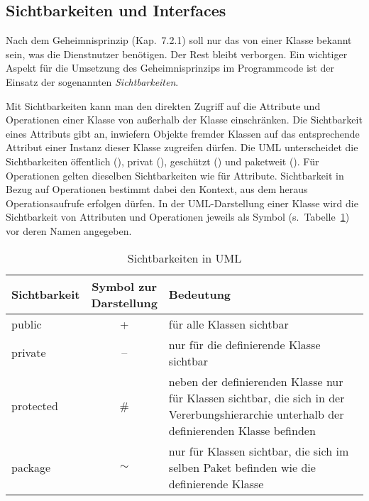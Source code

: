 \subsection{Sichtbarkeiten und Interfaces}
\label{sec:Kap-9.1.1}

Nach dem Geheimnisprinzip (Kap.~7.2.1) %
soll nur das von einer Klasse bekannt sein, was die Dienstnutzer benötigen. Der Rest bleibt verborgen. Ein wichtiger Aspekt für die Umsetzung des Geheimnisprinzips im Programmcode ist der Einsatz der sogenannten \textit{Sichtbarkeiten}.

Mit Sichtbarkeiten  kann man den direkten Zugriff auf die Attribute und Operationen einer Klasse von außerhalb der Klasse einschränken. Die Sichtbarkeit eines Attributs gibt an, inwiefern Objekte fremder Klassen auf das entsprechende Attribut einer Instanz dieser Klasse zugreifen dürfen. Die UML unterscheidet die Sichtbarkeiten öffentlich (), privat (), geschützt () und paketweit (). Für Operationen gelten dieselben Sichtbarkeiten wie für Attribute. Sichtbarkeit in Bezug auf Operationen bestimmt dabei den Kontext, aus dem heraus Operationsaufrufe erfolgen dürfen. In der UML-Darstellung einer Klasse wird die Sichtbarkeit von Attributen und Operationen jeweils als Symbol (s.~Tabelle~\ref{table:sichtbarkeiten_in_UML}) vor deren Namen angegeben. 

\begin{table}[ht]
	\setlength{\tabcolsep}{10pt}
	\renewcommand{\arraystretch}{1.5}
	
	\centering
	\begin{tabular}{|l|c|p{7cm}|}
		\hline
		Sichtbarkeit & \parbox[c][30pt]{2cm}{Symbol zur \\ Darstellung} & Bedeutung \\
		\hline
		public & + & für alle Klassen sichtbar \\
		\hline
		private & -- & nur für die definierende Klasse sichtbar \\
		\hline
		protected & \# & neben der definierenden Klasse nur für Klassen sichtbar, die sich in der Vererbungs\-hierarchie unterhalb der definierenden Klasse befinden \\
		\hline
		package & $\sim$ & nur für Klassen sichtbar, die sich im selben Paket befinden wie die definierende Klasse \\
		\hline
	\end{tabular}
	\caption{Sichtbarkeiten in UML}
	\label{table:sichtbarkeiten_in_UML}
\end{table}

